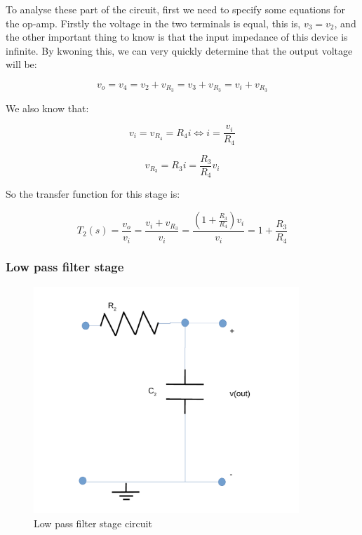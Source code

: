 To analyse these part of the circuit, first we need to specify some equations for the op-amp. 
Firstly the voltage in the two terminals is equal, this is, $v_3 = v_2$, and the other important thing to know is that the input impedance of this device is infinite. By kwoning this, we can very quickly determine that the output voltage will be:

\begin{equation}
v_o = v_4 = v_2 + v_{R_3} = v_3 + v_{R_3} = v_i + v_{R_3}
\end{equation} 

We also know that:

\begin{equation}
v_i = v_{R_4} = R_4i \iff i = \frac{v_i}{R_4}
\end{equation}

\begin{equation}
v_{R_3} = R_3i = \frac{R_3}{R_4}v_i
\end{equation}

So the transfer function for this stage is:

\begin{equation}
T_2(s) = \frac{v_o}{v_i} = \frac{v_i + v_{R_3}}{v_i} = \frac{(1+\frac{R_3}{R_4})v_i}{v_i} = 1 + \frac{R_3}{R_4}
\end{equation} 

\subsubsection{Low pass filter stage}

\begin{figure}[H] 
\centering
\includegraphics[width= 10cm]{low_pass_l5.pdf} 
\caption{Low pass filter stage circuit}
\label{lowpass}
\end{figure}

